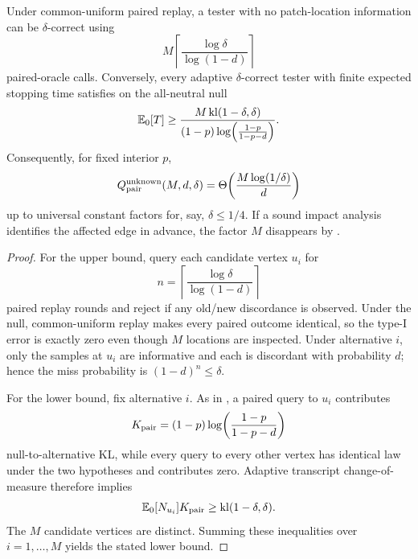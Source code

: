 \begin{corollary}
\label{arch:cor:bernoulli-location}
Under common-uniform paired replay, a tester with no patch-location information
can be \(\delta\)-correct using
\begin{equation}\label{eq:appendix-07-regression-consequences-008}
M\left\lceil
\frac{\log\delta}{\log(1-d)}
\right\rceil
\end{equation}
paired-oracle calls.  Conversely, every adaptive \(\delta\)-correct tester with
finite expected stopping time satisfies on the all-neutral null
\begin{equation}\label{eq:appendix-07-regression-consequences-009}
\mathbb{E}_0[T]
\ge
\frac{M\,\mathrm{kl}(1-\delta,\delta)}
{(1-p)\log\!\left(\frac{1-p}{1-p-d}\right)}.
\end{equation}
Consequently, for fixed interior \(p\),
\begin{equation}\label{eq:appendix-07-regression-consequences-010}
Q_{\rm pair}^{\rm unknown}(M,d,\delta)
=
\Theta\!\left(
\frac{M\log(1/\delta)}{d}
\right)
\end{equation}
up to universal constant factors for, say, \(\delta\le 1/4\).
If a sound impact analysis identifies the affected edge in advance, the factor
\(M\) disappears by .
\end{corollary}

\begin{proof}
For the upper bound, query each candidate vertex \(u_i\) for
\begin{equation}\label{eq:appendix-07-regression-consequences-011}
n=\left\lceil\frac{\log\delta}{\log(1-d)}\right\rceil
\end{equation}
paired replay rounds and reject if any old/new discordance is observed.  Under the
null, common-uniform replay makes every paired outcome identical, so the type-I
error is exactly zero even though \(M\) locations are inspected.  Under
alternative \(i\), only the samples at \(u_i\) are informative and each is
discordant with probability \(d\); hence the miss probability is
\((1-d)^n\le\delta\).

For the lower bound, fix alternative \(i\).  As in
, a paired query to \(u_i\) contributes
\begin{equation}\label{eq:appendix-07-regression-consequences-012}
K_{\rm pair}
=
(1-p)\log\!\left(\frac{1-p}{1-p-d}\right)
\end{equation}
null-to-alternative KL, while every query to every other vertex has identical law
under the two hypotheses and contributes zero.  Adaptive transcript
change-of-measure therefore implies
\begin{equation}\label{eq:appendix-07-regression-consequences-013}
\mathbb{E}_0[N_{u_i}]K_{\rm pair}
\ge
\mathrm{kl}(1-\delta,\delta).
\end{equation}
The \(M\) candidate vertices are distinct.  Summing these inequalities over
\(i=1,\ldots,M\) yields the stated lower bound.
\end{proof}

